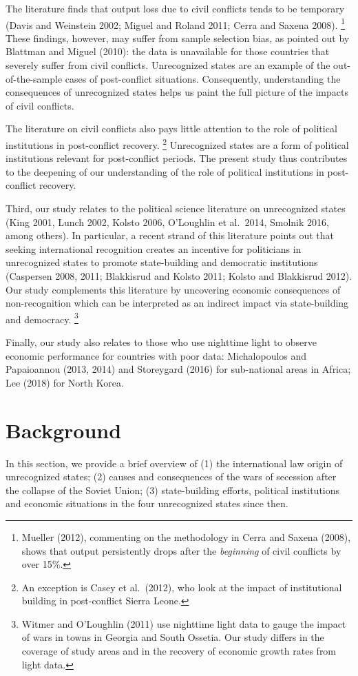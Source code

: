 \documentclass[12pt,a4paper]{article}%
\begin{document}
The literature finds that output loss due to civil conflicts tends to be temporary (Davis and Weinstein 2002; Miguel and Roland 2011; Cerra and Saxena 2008).%
\footnote{
	Mueller (2012), commenting on the methodology in Cerra and Saxena (2008), shows that output persistently drops after the \textit{beginning} of civil conflicts by over 15\%.
} 
These findings, however, may suffer from sample selection bias, as pointed out by Blattman and Miguel (2010): the data is unavailable for those countries that severely suffer from civil conflicts.   
Unrecognized states are an example of the out-of-the-sample cases of post-conflict situations. 
Consequently, understanding the consequences of unrecognized states helps us paint the full picture of the impacts of civil conflicts. 

The literature on civil conflicts also pays little attention to the role of political institutions in post-conflict recovery.%
\footnote{
	An exception is Casey et al.\ (2012), who look at the impact of institutional building in post-conflict Sierra Leone.
}
Unrecognized states are a form of political institutions relevant for post-conflict periods. 
The present study thus contributes to the deepening of our understanding of the role of political institutions in post-conflict recovery.

Third, our study relates to the political science literature on unrecognized states (King 2001, Lunch 2002, Kolsto 2006, O'Loughlin et al.\ 2014, Smolnik 2016, among others). 
In particular, a recent strand of this literature points out that seeking international recognition creates an incentive for politicians in unrecognized states to promote state-building and democratic institutions (Caspersen 2008, 2011; Blakkisrud and Kolsto 2011; Kolsto and Blakkisrud 2012).
Our study complements this literature by uncovering economic consequences of non-recognition which can be interpreted as an indirect impact via state-building and democracy.%
\footnote{
	Witmer and O'Loughlin (2011) use nighttime light data to gauge the impact of wars in towns in Georgia and South Ossetia. Our study differs in the coverage of study areas and in the recovery of economic growth rates from light data. 
} 

Finally, our study also relates to those who use nighttime light to observe economic performance for countries with poor data: Michalopoulos and Papaioannou (2013, 2014) and Storeygard (2016) for sub-national areas in Africa; Lee (2018) for North Korea. 

\section{Background}\label{background}
In this section, we provide a brief overview of (1) the international law origin of unrecognized states; (2) causes and consequences of the wars of secession after the collapse of the Soviet Union; (3) state-building efforts, political institutions and economic situations in the four unrecognized states since then.
\end{document}

